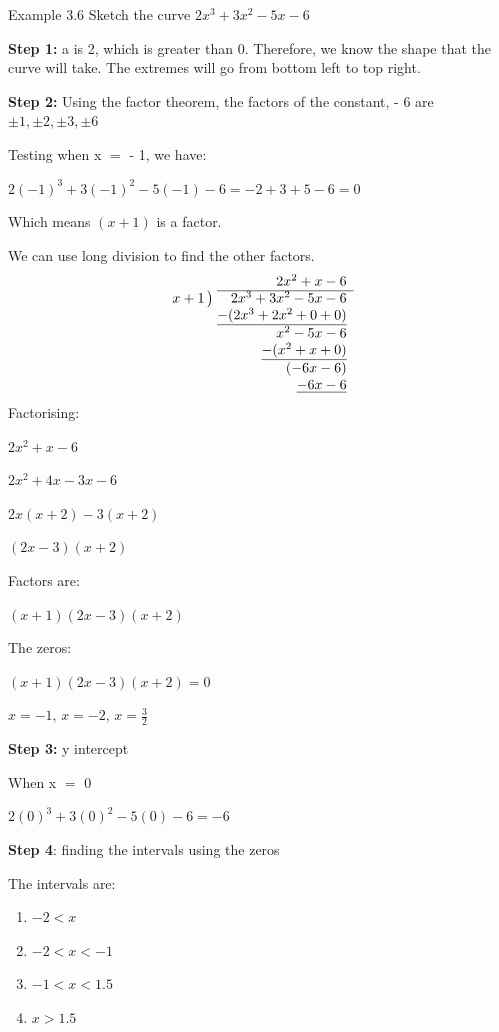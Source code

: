 \begin{example}{Example 3.6}
Sketch the curve $2x^3 + 3x^2 - 5x - 6$

\solution
\textbf{Step 1:} a is 2, which is greater than 0. Therefore, we know the shape that the
curve will take. The extremes will go from bottom left to top right.

\textbf{Step 2:} Using the factor theorem, the factors of the constant, - 6 are
$\pm 1, \pm 2, \pm 3, \pm 6$

Testing when x $=$ - 1, we have:

$2(-1)^3 + 3(-1)^2 - 5(-1) - 6 = -2 + 3 + 5 - 6 = 0$

Which means $(x + 1)$ is a factor.

We can use long division to find the other factors.
\[
\begin{array}{r@{\;}r}
 & 2x^2 + x - 6 \\ \cline{2-2}
x + 1\,\big) & 2x^3 + 3x^2 - 5x - 6 \\
 & \underline{-(2x^3 + 2x^2 + 0 + 0)} \\
 & x^2 - 5x - 6 \\
 & \underline{-(x^2 + x + 0)} \\
 & (-6x - 6) \\
 & \underline{-6x - 6}
\end{array}
\]
Factorising:

$2x^2 + x - 6$

$2x^2 + 4x - 3x - 6$

$2x(x + 2) - 3(x + 2)$

$(2x - 3)(x + 2)$

Factors are:

$(x + 1)(2x - 3)(x + 2)$

The zeros:

$(x + 1)(2x - 3)(x + 2) = 0$

$x = -1$, $x = -2$, $x = \frac{3}{2}$

\textbf{Step 3:} y intercept

When x $=$ 0

$2(0)^3 + 3(0)^2 - 5(0) - 6 = -6$

\textbf{Step 4}: finding the intervals using the zeros
\begin{center}
\end{center}
The intervals are:
\begin{enumerate}
  \item $-2 < x$
  \item $-2 < x < -1$
  \item $-1 < x < 1.5$
  \item $x > 1.5$
\end{enumerate}


\end{example}
